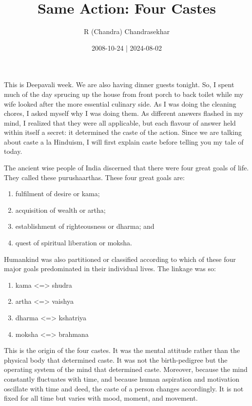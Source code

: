 \documentclass[
  a4paper,
]{article}
\title{Same Action: Four Castes}
\author{R (Chandra) Chandrasekhar}
\date{2008-10-24 | 2024-08-02}
\begin{document}
\maketitle

\thispagestyle{empty}


This is Deepavali week. We are also having dinner guests tonight. So, I
spent much of the day sprucing up the house from front porch to back
toilet while my wife looked after the more essential culinary side. As I
was doing the cleaning chores, I asked myself why I was doing them. As
different answers flashed in my mind, I realized that they were all
applicable, but each flavour of answer held within itself a secret: it
determined the caste of the action. Since we are talking about caste a
la Hinduism, I will first explain caste before telling you my tale of
today.

The ancient wise people of India discerned that there were four great
goals of life. They called these purushaarthas. These four great goals
are:

\begin{enumerate}
\def\labelenumi{\arabic{enumi}.}
\item
  fulfilment of desire or kama;
\item
  acquisition of wealth or artha;
\item
  establishment of righteousness or dharma; and
\item
  quest of spiritual liberation or moksha.
\end{enumerate}

Humankind was also partitioned or classified according to which of these
four major goals predominated in their individual lives. The linkage was
so:

\begin{enumerate}
\def\labelenumi{\arabic{enumi}.}
\item
  kama \textless=\textgreater{} shudra
\item
  artha \textless=\textgreater{} vaishya
\item
  dharma \textless=\textgreater{} kshatriya
\item
  moksha \textless=\textgreater{} brahmana
\end{enumerate}

This is the origin of the four castes. It was the mental attitude rather
than the physical body that determined caste. It was not the
birth-pedigree but the operating system of the mind that determined
caste. Moreover, because the mind constantly fluctuates with time, and
because human aspiration and motivation oscillate with time and deed,
the caste of a person changes accordingly. It is not fixed for all time
but varies with mood, moment, and movement.
\end{document}
